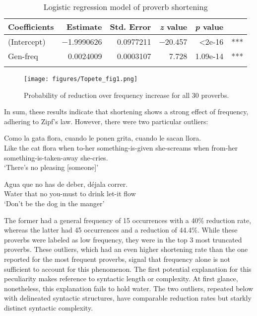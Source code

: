 \documentclass[output=paper,colorlinks,citecolor=brown,draftmode]{langscibook}
\begin{document}
\begin{table}%
\caption{Logistic regression model of proverb shortening}
\label{tab:1:logistic_regression}
 \begin{tabular}{l @{\hskip 0.25in} r @{\hskip 0.25in} r @{\hskip 0.25in} r @{\hskip 0.25in} r @{\hskip 0.25in} l}
  \lsptoprule
    Coefficients & Estimate & Std. Error & \textit{z} value & \textit{p} value & \\
  \midrule
  (Intercept) & $-$1.9990626 & 0.0977211 & $-$20.457 & \textless2e-16 & *** \\
  Gen-freq & 0.0024009 & 0.0003107 & 7.728 & 1.09e-14 & *** \\
  \lspbottomrule
 \end{tabular}
\end{table}

\begin{figure}
\caption{Probability of reduction over frequency increase for all 30 proverbs.}
\label{fig:logistic_graph}
\texttt{[image: figures/Topete\_fig1.png]}
\end{figure}
\newpage
In sum, these results indicate that shortening shows a strong effect of frequency, adhering to Zipf's law. However, there were two particular outliers:

\ea 
\gll Como la gata flora, cuando le ponen grita, cuando le sacan llora.\\
Like the cat flora	when to-her something-is-given	she-screams when from-her something-is-taken-away	she-cries.\\
\glt `There's no pleasing [someone]'\\\label{item:outlier1}
\z

\ea 
\gll Agua que no has de deber, d{é}jala correr.\\
Water that no you-must to drink	let-it flow\\
\glt `Don't be the dog in the manger'\\\label{item:outlier2}
\z

\noindent The former had a general frequency of 15 occurrences with a 40\% reduction rate, whereas the latter had 45 occurrences and a reduction of 44.4\%. While these proverbs were labeled as low frequency, they were in the top 3 most truncated proverbs. These outliers, which had an even higher shortening rate than the one reported for the most frequent proverbs, signal that frequency alone is not sufficient to account for this phenomenon. The first potential explanation for this peculiarity makes reference to syntactic length or complexity. At first glance, nonetheless, this explanation fails to hold water. The two outliers, repeated below with delineated syntactic structures, have comparable reduction rates but starkly distinct syntactic complexity.
\end{document}
